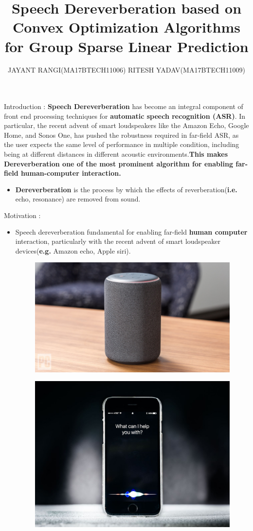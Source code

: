 \documentclass{beamer}
\title{Speech Dereverberation based on Convex Optimization
Algorithms for Group Sparse Linear Prediction}
\author{JAYANT RANGI(MA17BTECH11006) \newline RITESH YADAV(MA17BTECH11009) }
\begin{document}
\maketitle 
\begin{frame}{Introduction : }
\textbf{Speech Dereverberation} has become an integral component of front end
processing techniques for \textbf{automatic speech recognition (ASR)}.
In particular, the recent advent of smart loudspeakers like the Amazon
Echo, Google Home, and Sonos One, has pushed the robustness
required in far-field ASR, as the user expects the same level of
performance in multiple condition, including being at different distances
in different acoustic environments.\textbf{This makes Dereverberation
one of the most prominent algorithm for enabling far-field
human-computer interaction.}
\newline
\begin{itemize}
    \item \textbf{Dereverberation} is the process by which the effects of reverberation(\textbf{i.e.} echo, resonance) are removed from sound. 
\end{itemize}

\end{frame}
\begin{frame}{Motivation : }
\centering
\begin{itemize}
    \item Speech dereverberation fundamental for enabling far-field \textbf{human computer} interaction, particularly with the recent advent of smart loudspeaker devices(\textbf{e.g.} Amazon echo, Apple siri).
    \begin{figure}

\begin{minipage}{.5\textwidth}
  \centering
  \includegraphics[width=.5\linewidth]{echo.jpg}
  \label{fig:test1}
\end{minipage}%
\begin{minipage}{.5\textwidth}
  \centering
  \includegraphics[width=.5\linewidth]{siri.jpg}
  \label{fig:test2}
\end{minipage}
\end{figure}
    
\end{itemize}
    
\end{frame}
\end{document}
